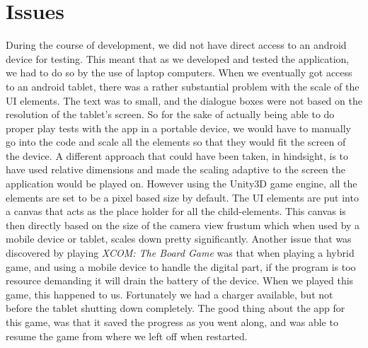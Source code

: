\section{Issues}
During the course of development, we did not have direct access to an android device for testing. This meant that as we developed and tested the application, we had to do so by the use of laptop computers. When we eventually got access to an android tablet, there was a rather substantial problem with the scale of the UI elements. The text was to small, and the dialogue boxes were not based on the resolution of the tablet's screen. So for the sake of actually being able to do proper play tests with the app in a portable device, we would have to manually go into the code and scale all the elements so that they would fit the screen of the device. A different approach that could have been taken, in hindsight, is to have used relative dimensions and made the scaling adaptive to the screen the application would be played on. However using the Unity3D game engine, all the elements are set to be a pixel based size by default. The UI elements are put into a canvas that acts as the place holder for all the child-elements. This canvas is then directly based on the size of the camera view frustum which when used by a mobile device or tablet, scales down pretty significantly. 
Another issue that was discovered by playing \textit{XCOM: The Board Game} \cite{game:xcomtbg} was that when playing a hybrid game, and using a mobile device to handle the digital part, if the program is too resource demanding it will drain the battery of the device. When we played this game, this happened to us. Fortunately we had a charger available, but not before the tablet shutting down completely. The good thing about the app for this game, was that it saved the progress as you went along, and was able to resume the game from where we left off when restarted.





